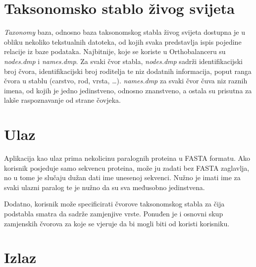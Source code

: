 \section{Taksonomsko stablo živog svijeta}
\label{sec:taxdb}

\emph{Taxonomy} baza, odnosno baza taksonomskog stabla živog svijeta
dostupna je u obliku nekoliko tekstualnih datoteka, od kojih svaka predstavlja
ispis pojedine relacije iz baze podataka. Najbitnije, koje se koriste u
Orthobalanceru su \emph{nodes.dmp} i \emph{names.dmp}. Za svaki čvor stabla,
\emph{nodes.dmp} sadrži identifikacijski broj čvora, identifikacijski broj
roditelja te niz dodatnih informacija, poput ranga čvora u stablu (carstvo,
rod, vrsta, \ldots). \emph{names.dmp} za svaki čvor čuva niz raznih imena, od
kojih je jedno jedinstveno, odnosno znanstveno, a ostala su prisutna za lakše
raspoznavanje od strane čovjeka.


\section{Ulaz}
\label{sec:input}

Aplikacija kao ulaz prima nekolicinu paralognih proteina u FASTA formatu. Ako
korisnik posjeduje samo sekvencu proteina, može ju zadati bez FASTA zaglavlja,
no u tome je slučaju dužan dati ime unesenoj sekvenci. Nužno je imati ime za svaki
ulazni paralog te je nužno da su sva međusobno jedinstvena.

Dodatno, korisnik može specificirati čvorove taksonomskog stabla za čija
podstabla smatra da sadrže zamjenjive vrste. Ponuđen je i osnovni skup
zamjenskih čvorova za koje se vjeruje da bi mogli biti od koristi korisniku.


\section{Izlaz}
\label{sec:output}

